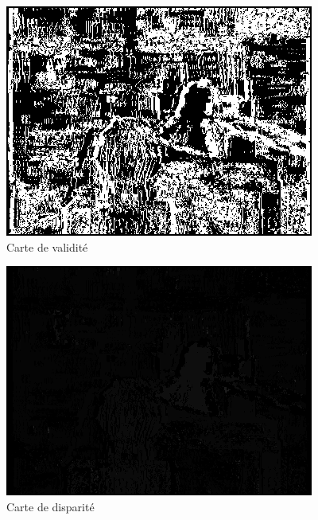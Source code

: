 \documentclass[a4paper]{article}
\begin{document}
\begin{figure}[h]
\begin{center}
	\includegraphics{validity-mask.png}
\end{center}
\caption{Carte de validité}
\end{figure}

\begin{figure}[h]
\begin{center}
	\includegraphics{disparity.png}
\end{center}
\caption{Carte de disparité}
\end{figure}
\end{document}
